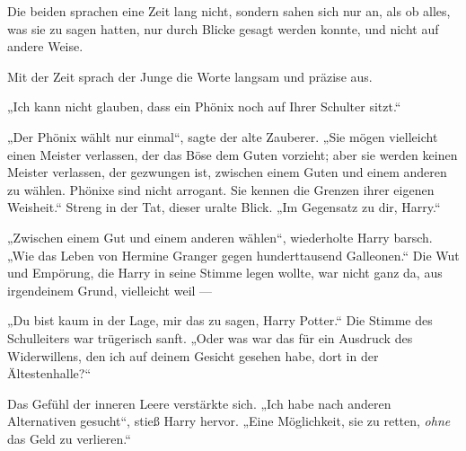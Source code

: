 Die beiden sprachen eine Zeit lang nicht, sondern sahen sich nur an, als ob alles, was sie zu sagen hatten, nur durch Blicke gesagt werden konnte, und nicht auf andere Weise.

Mit der Zeit sprach der Junge die Worte langsam und präzise aus.

„Ich kann nicht glauben, dass ein Phönix noch auf Ihrer Schulter sitzt.“

„Der Phönix wählt nur einmal“, sagte der alte Zauberer.
„Sie mögen vielleicht einen Meister verlassen, der das Böse dem Guten vorzieht; aber sie werden keinen Meister verlassen, der gezwungen ist, zwischen einem Guten und einem anderen zu wählen. Phönixe sind nicht arrogant. Sie kennen die Grenzen ihrer eigenen Weisheit.“
Streng in der Tat, dieser uralte Blick.
„Im Gegensatz zu dir, Harry.“

„Zwischen einem Gut und einem anderen wählen“, wiederholte Harry barsch.
„Wie das Leben von Hermine Granger gegen hunderttausend Galleonen.“
Die Wut und Empörung, die Harry in seine Stimme legen wollte, war nicht ganz da, aus irgendeinem Grund, vielleicht weil —

„Du bist kaum in der Lage, mir das zu sagen, Harry Potter.“
Die Stimme des Schulleiters war trügerisch sanft.
„Oder was war das für ein Ausdruck des Widerwillens, den ich auf deinem Gesicht gesehen habe, dort in der Ältestenhalle?“

Das Gefühl der inneren Leere verstärkte sich.
„Ich habe nach anderen Alternativen gesucht“, stieß Harry hervor.
„Eine Möglichkeit, sie zu retten, \emph{ohne} das Geld zu verlieren.“

